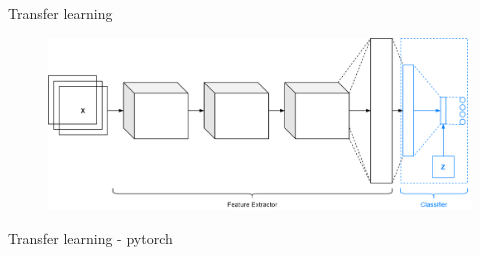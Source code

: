 \begin{frame}{Transfer learning}
	\begin{center}
		\begin{figure}
			\includegraphics[width=1\textwidth]{figures/deep_cnn_transfer_learning_3}
		\end{figure}
	\end{center}
\end{frame}
\begin{frame}{Transfer learning - pytorch}

\end{frame}

